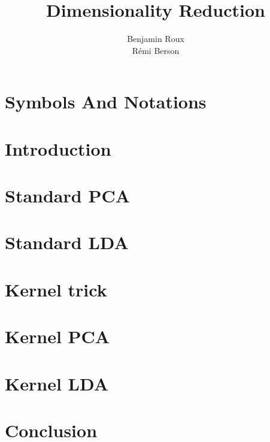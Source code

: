 \documentclass[a4paper]{article}
\title{Dimensionality Reduction}
\author{Benjamin Roux \\ Rémi Berson}
\date{}
\begin{document}
\maketitle



\section{Symbols And Notations}
\label{sec.notations}


\section{Introduction}
\label{sec.introduction}


\section{Standard PCA}
\label{sec.pca}


\section{Standard LDA}
\label{sec.lda}


\section{Kernel trick}
\label{sec.kerneltrick}


\section{Kernel PCA}
\label{sec.kpca}


\section{Kernel LDA}
\label{sec.klda}


\section{Conclusion}
\label{sec.conclusion}

\end{document}
